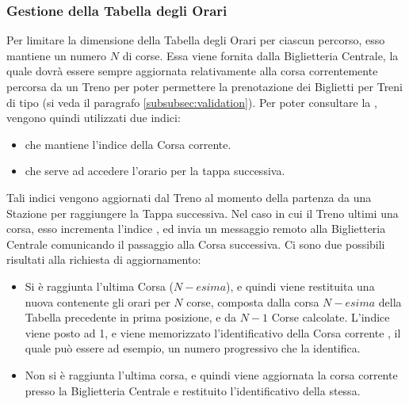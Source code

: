 
		\subsubsection{Gestione della Tabella degli Orari}
		
		Per limitare la dimensione della Tabella degli Orari per ciascun percorso, esso mantiene un numero $N$ di corse. Essa viene fornita dalla Biglietteria Centrale, la quale dovrà essere sempre aggiornata relativamente alla corsa correntemente percorsa da un Treno per poter permettere la prenotazione dei Biglietti per Treni di tipo  (si veda il paragrafo \ref{subsubsec:validation}). Per poter consultare la , vengono quindi utilizzati due indici:
		
		\begin{itemize}
			\item {} che mantiene l'indice della Corsa corrente.
			\item {} che serve ad accedere l'orario per la tappa successiva.
		\end{itemize}
		
	Tali indici vengono aggiornati dal Treno al momento della partenza da una Stazione per raggiungere la Tappa successiva. Nel caso in cui il Treno ultimi una corsa, esso incrementa l'indice , ed invia un messaggio remoto  alla Biglietteria Centrale comunicando il passaggio alla Corsa successiva. Ci sono due possibili risultati alla richiesta di aggiornamento:
	\begin{itemize}
		\item Si è raggiunta l'ultima Corsa ($N-esima$), e quindi viene restituita una nuova  contenente gli orari per $N$ corse, composta dalla corsa $N-esima$ della Tabella precedente in prima posizione, e da $N-1$ Corse calcolate. L'indice  viene posto ad 1, e viene memorizzato l'identificativo della Corsa corrente , il quale può essere ad esempio, un numero progressivo che la identifica.
		\item Non si è raggiunta l'ultima corsa, e quindi viene aggiornata la corsa corrente presso la Biglietteria Centrale e restituito l'identificativo della stessa.
	\end{itemize}
	
